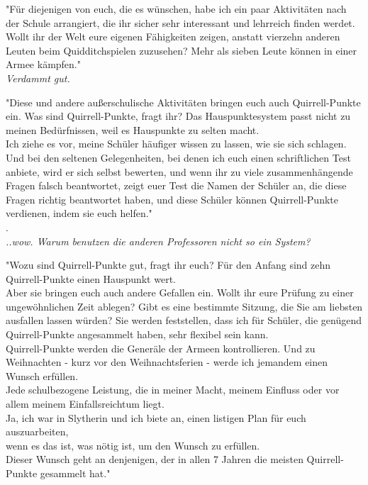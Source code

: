 {"Für diejenigen von euch, die es wünschen, habe ich ein paar Aktivitäten nach der Schule arrangiert, die ihr sicher sehr interessant und lehrreich finden werdet.\\ Wollt ihr der Welt eure eigenen Fähigkeiten zeigen, anstatt vierzehn anderen Leuten beim Quidditchspielen zuzusehen? Mehr als sieben Leute können in einer Armee kämpfen."\\ \emph{\hfill\break Verdammt gut.}

"Diese und andere außerschulische Aktivitäten bringen euch auch Quirrell-Punkte ein. Was sind Quirrell-Punkte, fragt ihr? Das Hauspunktesystem passt nicht zu meinen Bedürfnissen, weil es Hauspunkte zu selten macht.\\ Ich ziehe es vor, meine Schüler häufiger wissen zu lassen, wie sie sich schlagen. Und bei den seltenen Gelegenheiten, bei denen ich euch einen schriftlichen Test anbiete, wird er sich selbst bewerten, und wenn ihr zu viele zusammenhängende Fragen falsch beantwortet, zeigt euer Test die Namen der Schüler an, die diese Fragen richtig beantwortet haben, und diese Schüler können Quirrell-Punkte verdienen, indem sie euch helfen."\\ .\\ \emph{..wow. Warum benutzen die anderen Professoren nicht so ein System?}

"Wozu sind Quirrell-Punkte gut, fragt ihr euch? Für den Anfang sind zehn Quirrell-Punkte einen Hauspunkt wert.\\ Aber sie bringen euch auch andere Gefallen ein. Wollt ihr eure Prüfung zu einer ungewöhnlichen Zeit ablegen? Gibt es eine bestimmte Sitzung, die Sie am liebsten ausfallen lassen würden? Sie werden feststellen, dass ich für Schüler, die genügend Quirrell-Punkte angesammelt haben, sehr flexibel sein kann.\\ Quirrell-Punkte werden die Generäle der Armeen kontrollieren. Und zu Weihnachten - kurz vor den Weihnachtsferien - werde ich jemandem einen Wunsch erfüllen.\\ Jede schulbezogene Leistung, die in meiner Macht, meinem Einfluss oder vor allem meinem Einfallsreichtum liegt.\\ Ja, ich war in Slytherin und ich biete an, einen listigen Plan für euch auszuarbeiten,\\ wenn es das ist, was nötig ist, um den Wunsch zu erfüllen.\\ Dieser Wunsch geht an denjenigen, der in allen 7 Jahren die meisten Quirrell-Punkte gesammelt hat."

}
